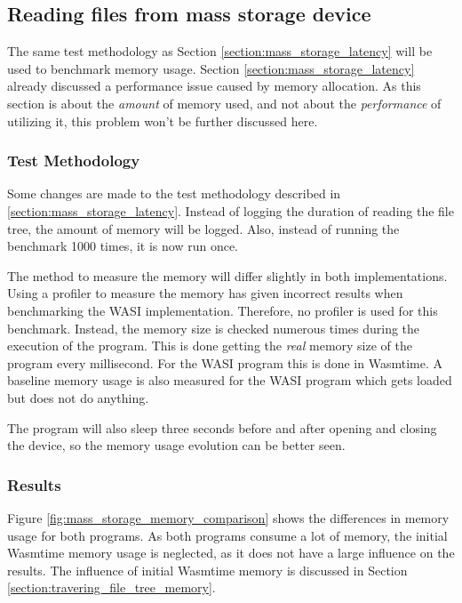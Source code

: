 \subsection{Reading files from mass storage device}
\label{section:reading_files_memory}
The same test methodology as Section \ref{section:mass_storage_latency} will be used to benchmark memory usage. Section \ref{section:mass_storage_latency} already discussed a performance issue caused by memory allocation. As this section is about the \textit{amount} of memory used, and not about the \textit{performance} of utilizing it, this problem won't be further discussed here.

\subsubsection{Test Methodology}
\label{section:reading_files_memory_test_setup}
Some changes are made to the test methodology described in \ref{section:mass_storage_latency}. Instead of logging the duration of reading the file tree, the amount of memory will be logged. Also, instead of running the benchmark 1000 times, it is now run once.

The method to measure the memory will differ slightly in both implementations. Using a profiler to measure the memory has given incorrect results when benchmarking the \acrshort{WASI} implementation. Therefore, no profiler is used for this benchmark. Instead, the memory size is checked numerous times during the execution of the program. This is done getting the \textit{real} memory size of the program every millisecond. For the \acrshort{WASI} program this is done in Wasmtime. A baseline memory usage is also measured for the \acrshort{WASI} program which gets loaded but does not do anything.

The program will also sleep three seconds before and after opening and closing the device, so the memory usage evolution can be better seen.

\subsubsection{Results} 

Figure \ref{fig:mass_storage_memory_comparison} shows the differences in memory usage for both programs. As both programs consume a lot of memory, the initial Wasmtime memory usage is neglected, as it does not have a large influence on the results. The influence of initial Wasmtime memory is discussed in Section \ref{section:travering_file_tree_memory}.


